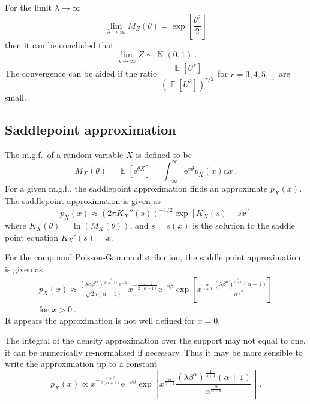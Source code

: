 \documentclass[12pt, a4paper]{memoir}
\DeclareMathOperator{\expectation}{\mathbb{E}}
\DeclareMathOperator{\normal}{N}
\newcommand{\euler}{\mathrm{e}}
\newcommand{\diff}{\mathrm{d}}
\newcommand{\dotdotdot}{_{\phantom{.}\cdots}}
\begin{document}
For the limit $\lambda\rightarrow\infty$
\begin{equation}
\lim_{\lambda\rightarrow\infty}M_Z(\theta) = \exp\left[\frac{\theta^2}{2}\right]
\end{equation}
then it can be concluded that
\begin{equation}
\lim_{\lambda\rightarrow\infty}Z\sim\normal(0,1) \ .
\end{equation}
The convergence can be aided if the ratio $\dfrac{\expectation[U^r]}{(\expectation[U^2])^{r/2}}$ for $r=3,4,5,\dotdotdot$ are small.

\subsection{Saddlepoint approximation}
The m.g.f.~of a random variable $X$ is defined to be
\begin{equation}
M_X(\theta)=\expectation[\euler^{\theta X}]
=
\int_{-\infty}^{\infty}\euler^{x\theta} p_X(x) \diff x \ .
\end{equation}
For a given m.g.f., the saddlepoint approximation \citep{daniels1954saddlepoint} \citep{butler2007saddlepoint} finds an approximate $p_X(x)$. The saddlepoint approximation is given as
\begin{equation}
p_X(x)\approx\left(2\pi K_X''(s)\right)^{-1/2}\exp\left[K_X(s)-sx\right]
\label{eq:saddlePoint:generalSaddlePoint}
\end{equation}
where $K_X(\theta) = \ln\left(M_X(\theta)\right)$, and $s=s(x)$ is the solution to the saddle point equation $K_X'(s)=x$.

For the compound Poisson-Gamma distribution, the saddle point approximation is given as 
\begin{multline}
p_X(x)\approx
\frac{\left(\lambda\alpha\beta^\alpha\right)^{\frac{1}{2(\alpha+1)}}\euler^{-\lambda}}{\sqrt{2\pi(\alpha+1)}}x^{-\frac{\alpha+2}{2(\alpha+1)}}
\euler^{-x\beta}
\exp\left[x^{\frac{\alpha}{\alpha+1}}
	\frac{(\lambda\beta^\alpha)^{\frac{1}{\alpha+1}}(\alpha+1)}{\alpha^{\frac{\alpha}{\alpha+1}}}
\right]
\\
\text{for }x>0 \ .
\label{eq:saddle_point_approx}
\end{multline}
It appears the approximation is not well defined for $x=0$.

The integral of the density approximation over the support may not equal to one, it can be numerically re-normalised if necessary. Thus it may be more sensible to write the approximation up to a constant
\begin{equation}
p_X(x)\propto x^{-\frac{\alpha+2}{2(\alpha+1)}}\euler^{-x\beta}\exp\left[x^{\frac{\alpha}{\alpha+1}}
	\frac{(\lambda\beta^\alpha)^{\frac{1}{\alpha+1}}(\alpha+1)}{\alpha^{\frac{\alpha}{\alpha+1}}}
\right] \ .
\end{equation}
\end{document}
